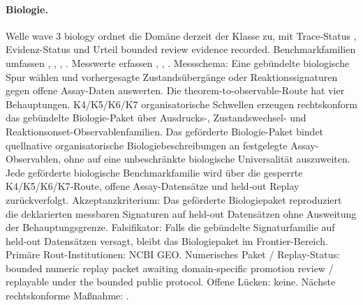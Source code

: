\paragraph{Biologie.}
Welle wave 3 biology ordnet die Domäne derzeit der Klasse  zu, mit Trace-Status , Evidenz-Status  und Urteil bounded review evidence recorded.
Benchmarkfamilien umfassen , \allowbreak {}, \allowbreak {}, \allowbreak {}.
Messwerte erfassen , \allowbreak {}, \allowbreak {}.
Messschema: Eine gebündelte biologische Spur wählen und vorhergesagte Zustandsübergänge oder Reaktionssignaturen gegen offene Assay-Daten auswerten.
Die theorem-to-observable-Route hat vier Behauptungen. K4/K5/K6/K7 organisatorische Schwellen erzeugen rechtskonform das gebündelte Biologie-Paket über Ausdrucks-, Zustandswechsel- und Reaktionsonset-Observablenfamilien. Das geförderte Biologie-Paket bindet quellnative organisatorische Biologiebeschreibungen an festgelegte Assay-Observablen, ohne auf eine unbeschränkte biologische Universalität auszuweiten. Jede geförderte biologische Benchmarkfamilie wird über die gesperrte K4/K5/K6/K7-Route, offene Assay-Datensätze und held-out Replay zurückverfolgt.
Akzeptanzkriterium: Das geförderte Biologiepaket reproduziert die deklarierten messbaren Signaturen auf held-out Datensätzen ohne Ausweitung der Behauptungsgrenze.
Falsifikator: Falls die gebündelte Signaturfamilie auf held-out Datensätzen versagt, bleibt das Biologiepaket im Frontier-Bereich.
Primäre Rout-Institutionen: NCBI GEO.
Numerisches Paket / Replay-Status: bounded numeric replay packet awaiting domain-specific promotion review / replayable under the bounded public protocol.
Offene Lücken: keine.
Nächste rechtskonforme Maßnahme: .


